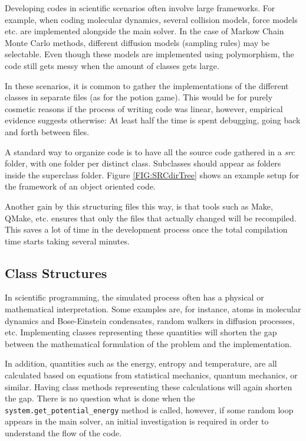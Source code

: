 Developing codes in scientific scenarios often involve large frameworks. For example, when coding molecular dynamics, several collision models, force models etc. are implemented alongside the main solver. In the case of Markow Chain Monte Carlo methods, different diffusion models (sampling rules) may be selectable. Even though these models are implemented using polymorphism, the code still gets messy when the amount of classes  gets large. 

In these scenarios, it is common to gather the implementations of the different classes in separate files (as for the potion game). This would be for purely cosmetic reasons if the process of writing code was linear, however, empirical evidence suggests otherwise: At least half the time is spent debugging, going back and forth between files. 

A standard way to organize code is to have all the source code gathered in a \textit{src} folder, with one folder per distinct class. Subclasses should appear as folders inside the superclass folder. Figure \ref{FIG:SRCdirTree} shows an example setup for the framework of an object oriented code.



Another gain by this structuring files this way, is that tools such as Make, QMake, etc. ensures that only the files that actually changed will be recompiled. This saves a lot of time in the development process once the total compilation time starts taking several minutes.

\subsection{Class Structures}

In scientific programming, the simulated process often has a physical or mathematical interpretation. Some examples are, for instance, atoms in molecular dynamics and Bose-Einstein condensates, random walkers in diffusion processes, etc. Implementing classes representing these quantities will shorten the gap between the mathematical formulation of the problem and the implementation.

In addition, quantities such as the energy, entropy and temperature, are all calculated based on equations from statistical mechanics, quantum mechanics, or similar. Having class methods representing these calculations will again shorten the gap. There is no question what is done when the \verb+system.get_potential_energy+ method is called, however, if some random loop appears in the main solver, an initial investigation is required in order to understand the flow of the code.

